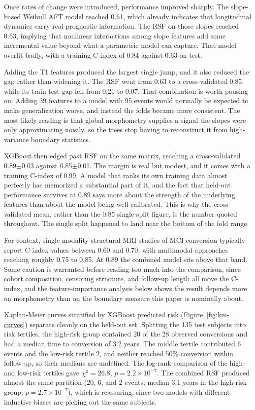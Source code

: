 \documentclass[blue]{ludusofficial}  %
\begin{document}
Once rates of change were introduced, performance improved sharply. The slope-based Weibull AFT model reached 0.61, which already indicates that longitudinal dynamics carry real prognostic information. The RSF on those slopes reached 0.63, implying that nonlinear interactions among slope features add some incremental value beyond what a parametric model can capture. That model overfit badly, with a training C-index of 0.84 against 0.63 on test.

Adding the T1 features produced the largest single jump, and it also reduced the gap rather than widening it. The RSF went from 0.63 to a cross-validated 0.85, while its train-test gap fell from 0.21 to 0.07. That combination is worth pausing on. Adding 39 features to a model with 95 events would normally be expected to make generalization worse, and instead the folds became more consistent. The most likely reading is that global morphometry supplies a signal the slopes were only approximating noisily, so the trees stop having to reconstruct it from high-variance boundary statistics.

XGBoost then edged past RSF on the same matrix, reaching a cross-validated 0.89$\pm$0.03 against 0.85$\pm$0.01. The margin is real but modest, and it comes with a training C-index of 0.99. A model that ranks its own training data almost perfectly has memorized a substantial part of it, and the fact that held-out performance survives at 0.89 says more about the strength of the underlying features than about the model being well calibrated. This is why the cross-validated mean, rather than the 0.85 single-split figure, is the number quoted throughout. The single split happened to land near the bottom of the fold range.

For context, single-modality structural MRI studies of MCI conversion typically report C-index values between 0.60 and 0.70, with multimodal approaches reaching roughly 0.75 to 0.85. At 0.89 the combined model sits above that band. Some caution is warranted before reading too much into the comparison, since cohort composition, censoring structure, and follow-up length all move the C-index, and the feature-importance analysis below shows the result depends more on morphometry than on the boundary measure this paper is nominally about.

Kaplan-Meier curves stratified by XGBoost predicted risk (Figure~\ref{fig:km-curves}) separate cleanly on the held-out set. Splitting the 135 test subjects into risk tertiles, the high-risk group contained 20 of the 28 observed conversions and had a median time to conversion of 3.2 years. The middle tertile contributed 6 events and the low-risk tertile 2, and neither reached 50\% conversion within follow-up, so their medians are undefined. The log-rank comparison of the high- and low-risk tertiles gave $\chi^2 = 26.8$, $p = 2.2 \times 10^{-7}$. The combined RSF produced almost the same partition (20, 6, and 2 events; median 3.1 years in the high-risk group; $p = 2.7 \times 10^{-7}$), which is reassuring, since two models with different inductive biases are picking out the same subjects.
\end{document}
